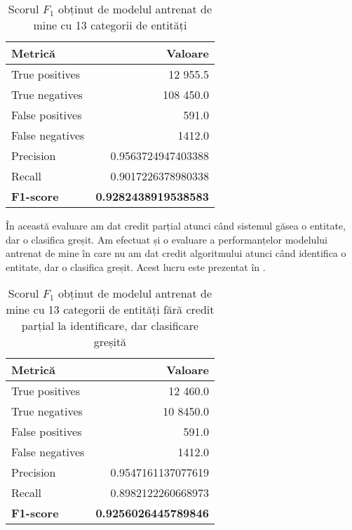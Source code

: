 \begin{center}
\begin{table}[htb]
  \caption{Scorul $F_1$ obținut de modelul antrenat de mine cu 13 categorii de entități}
  \begin{tabular}{|l|r|}
  \hline
   Metrică & Valoare\\
   \hline
  True positives & 12 955.5 \\
  True negatives & 108 450.0 \\
  False positives & 591.0 \\
  False negatives & 1412.0 \\
    \hline
  Precision & 0.9563724947403388 \\
  Recall & 0.9017226378980338 \\
  \hline
  \textbf{F1-score} & \textbf{0.9282438919538583} \\
   \hline
   
  \end{tabular}
  \label{table:f1-score-13-class}
\end{table}
\end{center}

În această evaluare am dat credit parțial atunci când sistemul găsea o entitate, dar o clasifica greșit. Am efectuat și o evaluare a performanțelor modelului antrenat de mine în care nu am dat credit algoritmului atunci când identifica o entitate, dar o clasifica greșit. Acest lucru este prezentat în .

\begin{center}
\begin{table}[htb]
  \caption{Scorul $F_1$ obținut de modelul antrenat de mine cu 13 categorii de entități fără credit parțial la identificare, dar clasificare greșită}
  \begin{tabular}{|l|r|}
  \hline
   Metrică & Valoare\\
   \hline
  True positives & 12 460.0 \\
  True negatives & 10 8450.0 \\
  False positives & 591.0 \\
  False negatives & 1412.0 \\
    \hline
  Precision & 0.9547161137077619\\
  Recall & 0.8982122260668973 \\
  \hline
  \textbf{F1-score} & \textbf{0.9256026445789846} \\
   \hline
   
  \end{tabular}
  \label{table:f1-score-13-class-no-credit}
\end{table}
\end{center}


